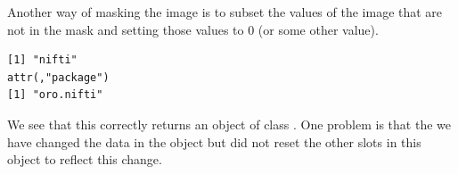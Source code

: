 Another way of masking the image is to subset the values of the image that are not in the mask and setting those values to $0$ (or some other value).
\begin{knitrout}
\color{fgcolor}\begin{kframe}
\begin{alltt}
 \hlkwb{=} 
\hlstd{base_t1_2[base_t1_mask} \hlopt{==} \hlstd{]} \hlkwb{=} 
\end{alltt}
\begin{verbatim}
[1] "nifti"
attr(,"package")
[1] "oro.nifti"
\end{verbatim}
\end{kframe}
\end{knitrout}

We see that this correctly returns an object of class .  One problem is that the we have changed the data in the  object   but did not reset the other slots in this object to reflect this change.


